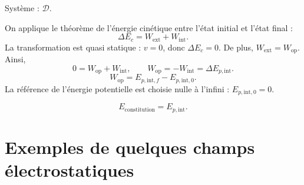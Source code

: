 \documentclass[11pt,a4paper]{article}
\newcommand{\D}{\mathcal D}\newcommand{\R}{\mathcal R}
\begin{document}
Système : $\D$.

On applique le théorème de l'énergie cinétique entre l'état initial et l'état final :
\[\Delta E_c=W_{\mathrm{ext}}+W_{\mathrm{int}}.\]
La transformation est quasi statique : $v=0$, donc $\Delta E_c=0$. De plus, $W_{\mathrm{ext}}=W_{\mathrm{op}}$. Ainsi,
\[0=W_{\mathrm{op}}+W_{\mathrm{int}},\qquad W_{\mathrm{op}}=-W_{\mathrm{int}}=\Delta E_{p,\mathrm{int}}.\]
\[W_{\mathrm{op}}=E_{p,\mathrm{int},f}-E_{p,\mathrm{int},0}.\]
La référence de l'énergie potentielle est choisie nulle à l'infini : $E_{p,\mathrm{int},0}=0$.
\begin{cadre}\[E_{\mathrm{constitution}}=E_{p,\mathrm{int}}.\]\end{cadre}
\Needspace{65mm}
\section{Exemples de quelques champs électrostatiques}
\end{document}

